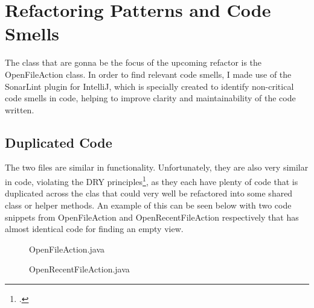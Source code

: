 \section{Refactoring Patterns and Code Smells}




The class that are gonna be the focus of the upcoming refactor is the OpenFileAction class. In order to find relevant code smells, I made use of the SonarLint plugin for IntelliJ, which is specially created to identify non-critical code smells in code, helping to improve clarity and maintainability of the code written.

\subsection{Duplicated Code}
The two files are similar in functionality. Unfortunately, they are also very similar in code, violating the DRY principles\footcite{kerievsky}, as they each have plenty of code that is duplicated across the clas that could very well be refactored into some shared class or helper methods. An example of this can be seen below with two code snippets from OpenFileAction and OpenRecentFileAction respectively that has almost identical code for finding an empty view.
\begin{figure}[H]
  
  \caption{OpenFileAction.java}
\end{figure}

\begin{figure}[H]
  
  \caption{OpenRecentFileAction.java}
\end{figure}

